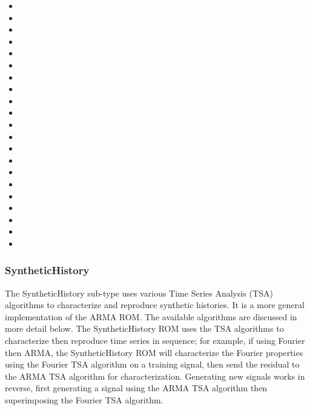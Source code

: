 \begin{itemize}
  \item {}
  \item {}
  \item {}
  \item {}
  \item {}
  \item {}
  \item {}
  \item {}
  \item {}
  \item {}
  \item {}
  \item {}
  \item {}
  \item {}
  \item {}
  \item {}
  \item {}
  \item {}
  \item {}
  \item {}
  \item {}
\end{itemize}

\subsubsection{SyntheticHistory}
\label{subsubsec:arma}
The SyntheticHistory sub-type uses various Time Series Analysis (TSA) algorithms to characterize and
reproduce synthetic histories. It is a more general implementation of the ARMA ROM. The available
algorithms are discussed in more detail below. The SyntheticHistory ROM uses the TSA algorithms to
characterize then reproduce time series in sequence; for example, if using Fourier then ARMA, the
SyntheticHistory ROM will characterize the Fourier properties using the Fourier TSA algorithm on a
training signal, then send the residual to the ARMA TSA algorithm for characterization. Generating
new signals works in reverse, first generating a signal using the ARMA TSA algorithm then
superimposing the Fourier TSA algorithm.

